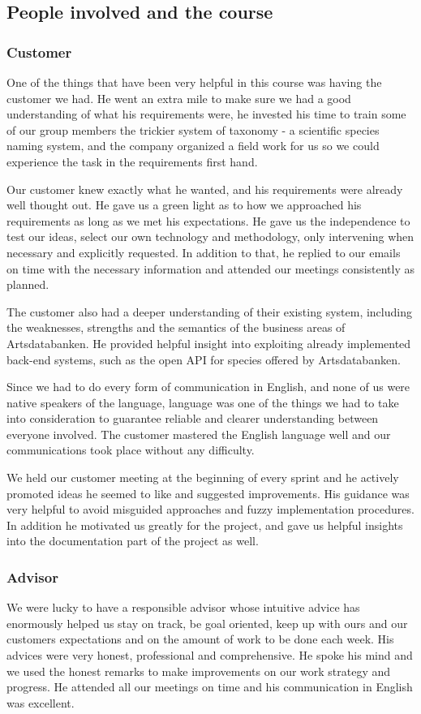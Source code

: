 \subsection{People involved and the course}
	\subsubsection{Customer}
One of the things that have been very helpful in this course was having the
customer we had. He went an extra mile to make sure we had a good understanding
of what his requirements were, he invested his time to train some of our
group members the trickier system of taxonomy - a scientific species naming
system, and the company organized a field work for us so we could experience the
task in the requirements first hand.

Our customer knew exactly what he wanted, and his requirements were already well
thought out. He gave us a green light as to how we approached his requirements
as long as we met his expectations. He gave us the independence to test our
ideas, select our own technology and methodology, only intervening when
necessary and explicitly requested. In addition to that, he replied to our
emails on time with the necessary information and attended our meetings
consistently as planned.

The customer also had a deeper understanding of their existing system, including
the weaknesses, strengths and the semantics of the business areas of
Artsdatabanken. He provided helpful insight into exploiting already implemented
back-end systems, such as the open API for species offered by Artsdatabanken.

Since we had to do every form of communication in English, and none of us were
native speakers of the language, language was one of the things we had to take
into consideration to guarantee reliable and clearer understanding between
everyone involved. The customer mastered the English language well and our
communications took place without any difficulty.

We held our customer meeting at the beginning of every sprint and he
actively promoted ideas he seemed to like and suggested improvements.  His
guidance was very helpful to avoid misguided approaches and fuzzy implementation
procedures. In addition he motivated us greatly for the project, and gave us
helpful insights into the documentation part of the project as well.

	\subsubsection{Advisor}
We were lucky to have a responsible advisor whose intuitive advice has
enormously helped us stay on track, be goal oriented, keep up with ours and our
customers expectations and on the amount of work to be done each week. His
advices were very honest, professional and comprehensive. He spoke his mind and
we used the honest remarks to make improvements on our work strategy and
progress. He attended all our meetings on time and his communication in English
was excellent.

